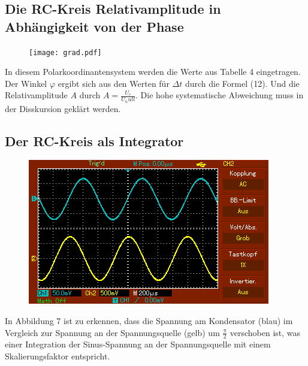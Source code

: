 	 \subsection{Die RC-Kreis Relativamplitude in Abhängigkeit von der Phase}

	 \begin{figure}[H]
	  \centering
	  \caption{}
	  \texttt{[image: grad.pdf]}
	  \label{fig:grad}
	 \end{figure}
	 
	 In diesem Polarkoordinantensystem werden die Werte aus Tabelle 4 eingetragen. Der Winkel $\varphi$ ergibt sich aus den Werten für $\Delta t$ durch die Formel (12). Und die Relativamplitude $A$ durch $A=\frac{U_c}{U_null}$. Die hohe systematische Abweichung muss in der Disskursion geklärt werden.
	 
	 
	 
	 \subsection{Der RC-Kreis als Integrator}
	 \begin{figure}[H]
	 	\centering
	 	\caption{}
	 	\includegraphics[width=\linewidth-70pt,height=\textheight-70pt,keepaspectratio]{content/MAP002.png}
	 	\label{fig:Sinus}
	 \end{figure}
	 In Abbildung 7 ist zu erkennen, dass die Spannung am Kondensator (blau) im Vergleich zur Spannung an der Spannungsquelle (gelb) um $\frac{\pi}{2}$ verschoben ist, was einer Integration der Sinus-Spannung an der Spannungsquelle mit einem Skalierungsfaktor entspricht. 
	 
